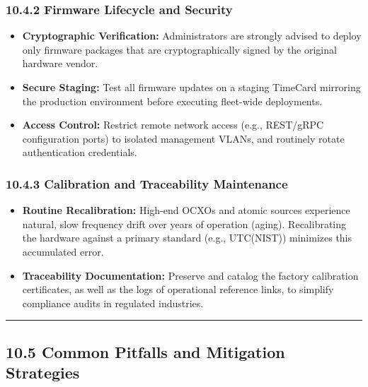 \documentclass[
]{article}
\begin{document}
\subsubsection{10.4.2 Firmware Lifecycle and
Security}\label{firmware-lifecycle-and-security}

\begin{itemize}
\item
  \textbf{Cryptographic Verification:} Administrators are strongly
  advised to deploy only firmware packages that are cryptographically
  signed by the original hardware vendor.
\item
  \textbf{Secure Staging:} Test all firmware updates on a staging
  TimeCard mirroring the production environment before executing
  fleet-wide deployments.
\item
  \textbf{Access Control:} Restrict remote network access (e.g.,
  REST/gRPC configuration ports) to isolated management VLANs, and
  routinely rotate authentication credentials.
\end{itemize}

\subsubsection{10.4.3 Calibration and Traceability
Maintenance}\label{calibration-and-traceability-maintenance}

\begin{itemize}
\item
  \textbf{Routine Recalibration:} High-end OCXOs and atomic sources
  experience natural, slow frequency drift over years of operation
  (aging). Recalibrating the hardware against a primary standard (e.g.,
  UTC(NIST)) minimizes this accumulated error.
\item
  \textbf{Traceability Documentation:} Preserve and catalog the factory
  calibration certificates, as well as the logs of operational reference
  links, to simplify compliance audits in regulated industries.
\end{itemize}

\begin{center}\rule{0.5\linewidth}{0.5pt}\end{center}

\subsection{10.5 Common Pitfalls and Mitigation
Strategies}\label{common-pitfalls-and-mitigation-strategies}
\end{document}
